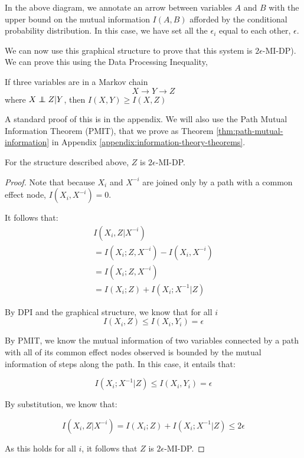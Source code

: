 \documentclass[../thesis.tex]{subfiles}
\begin{document}
In the above diagram, we annotate an arrow between
variables $A$ and $B$ with the upper bound on the
mutual information $I(A,B)$ afforded by the conditional
probability distribution. In this case, we
have set all the $\epsilon_i$ equal to each other,
$\epsilon$.

We can now use this graphical structure to prove
that this system is $2\epsilon$-MI-DP).
We can prove this using the Data Processing Inequality,

\begin{prp}
  If three variables are in a Markov chain
  $$X \rightarrow Y \rightarrow Z$$
  where $X \independent Z \vert Y$, then $I(X,Y) \geq I(X,Z)$
\end{prp}

A standard proof of this is in the appendix.
We will also use the Path Mutual Information Theorem (PMIT),
that we prove as Theorem \ref{thm:path-mutual-information} in
Appendix \ref{appendix:information-theory-theorems}.

\begin{exm}
  For the structure described above,
  $Z$ is $2\epsilon$-MI-DP.
\end{exm}

\begin{proof}
  Note that because $X_i$ and $X^{-i}$
  are joined only by a path with a common
  effect node, $I(X_i,X^{-i}) = 0$.

  It follows that:
  \begin{equation}
    \begin{split}
      I(X_i, Z \vert X^{-i})\\
      = I(X_i;Z,X^{-i}) - I(X_i,X^{-i}) \\
      = I(X_i;Z,X^{-i}) \\
      = I(X_i;Z) + I(X_i;X^{-1} \vert Z)
    \end{split}
  \end{equation}

  By DPI and the graphical structure,
  we know that for all $i$
  $$I(X_i,Z) \leq I(X_i,Y_i) = \epsilon$$

  By PMIT, we know the mutual information of
  two variables connected by a path with all
  of its common effect nodes observed is bounded
  by the mutual information of steps along the path.
  In this case, it entails that:

  $$I(X_i;X^{-1} \vert Z) \leq I(X_i,Y_i) = \epsilon$$

  By substitution, we know that:

  $$I(X_i, Z \vert X^{-i}) = I(X_i;Z) + I(X_i;X^{-1} \vert Z) \leq 2\epsilon$$

  As this holds for all $i$, it follows that $Z$ is $2\epsilon$-MI-DP.
\end{proof}
\end{document}
